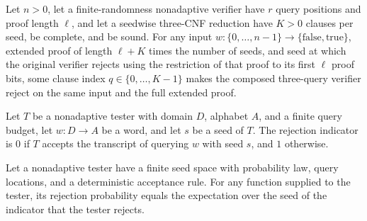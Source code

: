 \begin{theorem}
\label{FABL.exists_rejecting_composed_clause}
\leanok
{}
Let $n>0$, let a finite-randomness nonadaptive verifier have $r$ query positions and
proof length $\ell$, and let a seedwise three-CNF reduction have $K>0$ clauses per seed,
be complete, and be sound. For any input
$w:\{0,\ldots,n-1\}\to\{\mathrm{false},\mathrm{true}\}$, extended proof of length
$\ell+K$ times the number of seeds, and seed at which the original verifier rejects
using the restriction of that proof to its first $\ell$ proof bits, some clause index
$q\in\{0,\ldots,K-1\}$ makes the composed three-query verifier reject on the same input
and the full extended proof.
\end{theorem}

\begin{definition}
\label{FABL.testerRejectionIndicator}
\leanok
{}
Let $T$ be a nonadaptive tester with domain $D$, alphabet $A$, and a finite query
budget, let $w:D\to A$ be a word, and let $s$ be a seed of $T$. The rejection indicator
is $0$ if $T$ accepts the transcript of querying $w$ with seed $s$, and $1$ otherwise.
\end{definition}

\begin{theorem}
\label{FABL.rejectionProbability_eq_indicatorExpectation}
\leanok
{}
Let a nonadaptive tester have a finite seed space with probability law, query locations,
and a deterministic acceptance rule. For any function supplied to the tester, its
rejection probability equals the expectation over the seed of the indicator that the
tester rejects.
\end{theorem}

